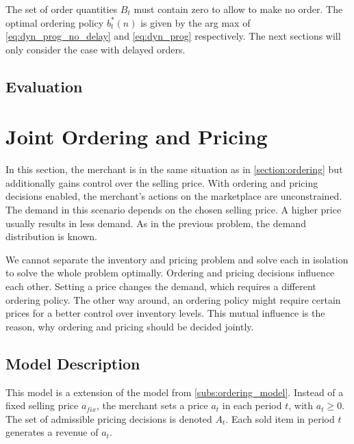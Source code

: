 The set of order quantities $B_t$ must contain zero to allow to make no order.
The optimal ordering policy $b_t^*(n)$ is given by the arg max of \cref{eq:dyn_prog_no_delay} and \cref{eq:dyn_prog} respectively.
The next sections will only consider the case with delayed orders.

\subsection{Evaluation}


\section{Joint Ordering and Pricing}
\label{section:joint_ordering_pricing}
In this section, the merchant is in the same situation as in \cref{section:ordering} but additionally gains control over the selling price.
With ordering and pricing decisions enabled, the merchant's actions on the marketplace are unconstrained.
The demand in this scenario depends on the chosen selling price.
A higher price usually results in less demand.
As in the previous problem, the demand distribution is known.

We cannot separate the inventory and pricing problem and solve each in isolation to solve the whole problem optimally.
Ordering and pricing decisions influence each other.
Setting a price changes the demand, which requires a different ordering policy.
The other way around, an ordering policy might require certain prices for a better control over inventory levels.
This mutual influence is the reason, why ordering and pricing should be decided jointly.

\subsection{Model Description}
This model is a extension of the model from \cref{subs:ordering_model}.
Instead of a fixed selling price $a_{fix}$, the merchant sets a price $a_t$ in each period $t$, with $a_t \geq 0$.
The set of admissible pricing decisions is denoted $A_t$.
Each sold item in period $t$ generates a revenue of $a_t$.

